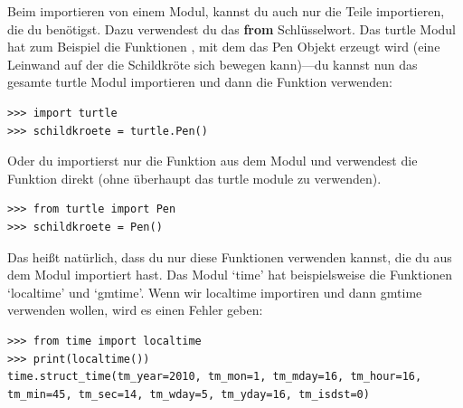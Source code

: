 Beim importieren von einem Modul, kannst du auch nur die Teile importieren, die du benötigst. Dazu verwendest du das \textbf{from} Schlüsselwort. Das turtle Modul hat zum Beispiel die Funktionen , mit dem das Pen Objekt erzeugt wird (eine Leinwand auf der die Schildkröte sich bewegen kann)---du kannst nun das gesamte turtle Modul importieren und dann die  Funktion verwenden:

\begin{Verbatim}[frame=single]
>>> import turtle
>>> schildkroete = turtle.Pen()
\end{Verbatim}

Oder du importierst nur die  Funktion aus dem Modul und verwendest die Funktion direkt (ohne überhaupt das turtle module zu verwenden).

\begin{Verbatim}[frame=single]
>>> from turtle import Pen
>>> schildkroete = Pen()
\end{Verbatim}

Das heißt natürlich, dass du nur diese Funktionen verwenden kannst, die du aus dem Modul importiert hast. Das Modul `time' hat beispielsweise die Funktionen `localtime' und `gmtime'. Wenn wir localtime importiren und dann gmtime verwenden wollen, wird es einen Fehler geben: 

\begin{Verbatim}[frame=single]
>>> from time import localtime
>>> print(localtime())
time.struct_time(tm_year=2010, tm_mon=1, tm_mday=16, tm_hour=16, 
tm_min=45, tm_sec=14, tm_wday=5, tm_yday=16, tm_isdst=0)
\end{Verbatim}

